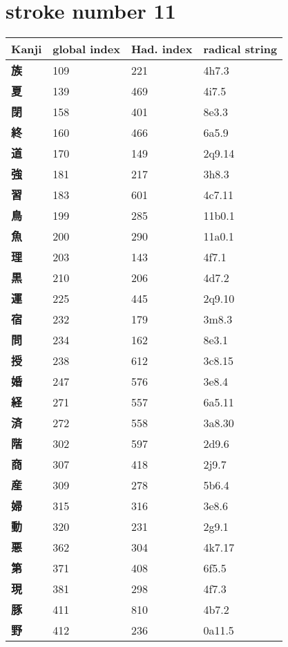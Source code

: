 \section{stroke number 11}
  \begin{longtable}[c]{llll}
    \bfseries Kanji & \bfseries global index & \bfseries Had. index & \bfseries radical string\\\hline\endhead
    \bfseries 族 & 109 & 221 & 4h7.3\\
    \bfseries 夏 & 139 & 469 & 4i7.5\\
    \bfseries 閉 & 158 & 401 & 8e3.3\\
    \bfseries 終 & 160 & 466 & 6a5.9\\
    \bfseries 道 & 170 & 149 & 2q9.14\\
    \bfseries 強 & 181 & 217 & 3h8.3\\
    \bfseries 習 & 183 & 601 & 4c7.11\\
    \bfseries 鳥 & 199 & 285 & 11b0.1\\
    \bfseries 魚 & 200 & 290 & 11a0.1\\
    \bfseries 理 & 203 & 143 & 4f7.1\\
    \bfseries 黒 & 210 & 206 & 4d7.2\\
    \bfseries 運 & 225 & 445 & 2q9.10\\
    \bfseries 宿 & 232 & 179 & 3m8.3\\
    \bfseries 問 & 234 & 162 & 8e3.1\\
    \bfseries 授 & 238 & 612 & 3c8.15\\
    \bfseries 婚 & 247 & 576 & 3e8.4\\
    \bfseries 経 & 271 & 557 & 6a5.11\\
    \bfseries 済 & 272 & 558 & 3a8.30\\
    \bfseries 階 & 302 & 597 & 2d9.6\\
    \bfseries 商 & 307 & 418 & 2j9.7\\
    \bfseries 産 & 309 & 278 & 5b6.4\\
    \bfseries 婦 & 315 & 316 & 3e8.6\\
    \bfseries 動 & 320 & 231 & 2g9.1\\
    \bfseries 悪 & 362 & 304 & 4k7.17\\
    \bfseries 第 & 371 & 408 & 6f5.5\\
    \bfseries 現 & 381 & 298 & 4f7.3\\
    \bfseries 豚 & 411 & 810 & 4b7.2\\
    \bfseries 野 & 412 & 236 & 0a11.5\\

\end{longtable}
